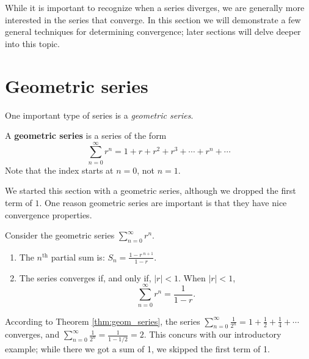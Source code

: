 \documentclass{ximera}
\begin{document}
While it is important to recognize when a series diverges, we are
generally more interested in the series that converge. In this section
we will demonstrate a few general techniques for determining
convergence; later sections will delve deeper into this topic.

\section{Geometric series}

One important type of series is a \textit{geometric series}.

{A \textbf{geometric series} is a series of the form 
$$\sum_{n=0}^\infty r^n = 1+r+r^2+r^3+\cdots+r^n+\cdots$$
Note that the index starts at $n=0$, not $n=1$.%
}

We started this section with a geometric series, although we dropped the first term of $1$. One reason geometric series are important is that they have nice convergence properties.

{Consider the geometric series $\sum_{n=0}^\infty r^n$.
\begin{enumerate}
\item		The $n^\text{th}$ partial sum is: $S_n = \frac{1-r\,^{n+1}}{1-r}$.
\item		The series converges if, and only if, $|r| < 1$. When $|r|<1$, 
$$\sum_{n=0}^\infty r^n = \frac{1}{1-r}.$$
\end{enumerate}
}

According to Theorem \ref{thm:geom_series}, the series $\sum_{n=0}^\infty \frac{1}{2^n} = 1+\frac12+\frac14+\cdots$ converges, and $\sum_{n=0}^\infty \frac{1}{2^n} = \frac{1}{1-1/2} = 2.$ This concurs with our introductory example; while there we got a sum of 1, we skipped the first term of 1.\\
\end{document}
